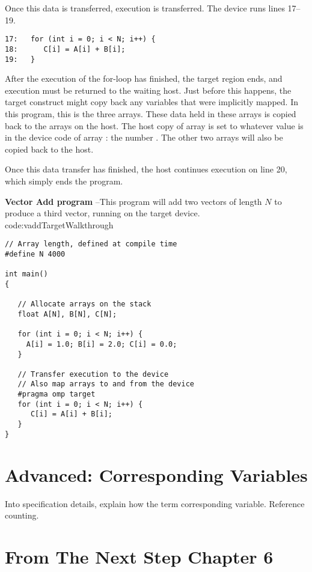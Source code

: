 Once this data is transferred, execution is transferred.
The device runs lines 17--19.
\begin{verbatim}
17:   for (int i = 0; i < N; i++) {
18:      C[i] = A[i] + B[i];
19:   }
\end{verbatim}

After the execution of the for-loop has finished, the target region ends, and execution must be returned to the waiting host.
Just before this happens, the target construct might copy back any variables that were implicitly mapped.
In this program, this is the three arrays.
These data held in these arrays is copied back to the arrays on the host.
The host copy of array  is set to whatever value is in the device code of array : the number .
The other two arrays will also be copied back to the host.

Once this data transfer has finished, the host continues execution on line 20, which simply ends the program.


\begin{CodeExample}%
{\textbf{Vector Add program} --\small This program will add two vectors of length $N$
to produce a third vector, running on the target device.
}%
{code:vaddTargetWalkthrough}
\begin{lstlisting}
// Array length, defined at compile time
#define N 4000

int main()
{

   // Allocate arrays on the stack
   float A[N], B[N], C[N];

   for (int i = 0; i < N; i++) {
     A[i] = 1.0; B[i] = 2.0; C[i] = 0.0;
   }

   // Transfer execution to the device
   // Also map arrays to and from the device
   #pragma omp target
   for (int i = 0; i < N; i++) {
      C[i] = A[i] + B[i];
   }
}	  
\end{lstlisting}
\end{CodeExample}

\section{Advanced: Corresponding Variables}
Into specification details, explain how the term corresponding variable.
Reference counting.


\section{From The Next Step Chapter 6}

